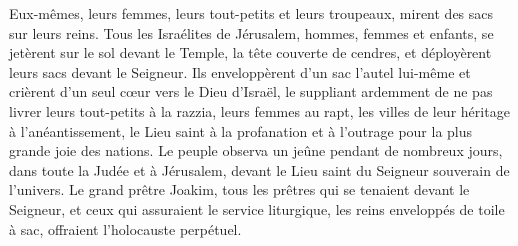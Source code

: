 Eux-mêmes, leurs femmes, leurs tout-petits et leurs troupeaux,
	mirent des sacs sur leurs reins.
Tous les Israélites de Jérusalem, hommes, femmes et enfants,
	se jetèrent sur le sol devant le Temple, la tête couverte de cendres,
	et déployèrent leurs sacs devant le Seigneur.
Ils enveloppèrent d'un sac l'autel lui-même
	et crièrent d'un seul cœur vers le Dieu d'Israël,
	le suppliant ardemment de ne pas livrer leurs tout-petits à la razzia,
	leurs femmes au rapt, les villes de leur héritage à l'anéantissement,
	le Lieu saint à la profanation et à l'outrage pour la plus grande joie des nations.
Le peuple observa un jeûne pendant de nombreux jours, dans toute la Judée et à Jérusalem,
	devant le Lieu saint du Seigneur souverain de l'univers.
Le grand prêtre Joakim, tous les prêtres qui se tenaient devant le Seigneur,
		et ceux qui assuraient le service liturgique,
	les reins enveloppés de toile à sac, offraient l'holocauste perpétuel.
